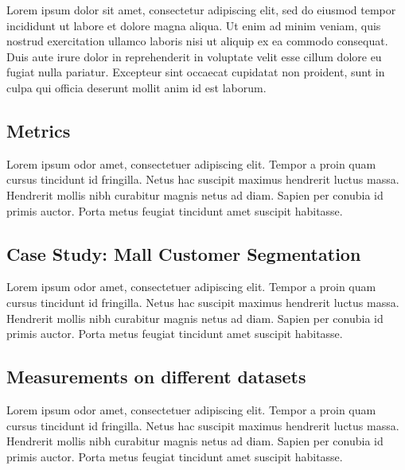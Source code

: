 \documentclass[10pt,twocolumn,letterpaper]{article}
\begin{document}
Lorem ipsum dolor sit amet, consectetur adipiscing elit, sed do eiusmod tempor
incididunt ut labore et dolore magna aliqua. Ut enim ad minim veniam, quis
nostrud exercitation ullamco laboris nisi ut aliquip ex ea commodo consequat.
Duis aute irure dolor in reprehenderit in voluptate velit esse cillum dolore eu
fugiat nulla pariatur. Excepteur sint occaecat cupidatat non proident, sunt in
culpa qui officia deserunt mollit anim id est laborum.


\subsection{Metrics}

Lorem ipsum odor amet, consectetuer adipiscing elit. Tempor a proin quam cursus
tincidunt id fringilla. Netus hac suscipit maximus hendrerit luctus massa.
Hendrerit mollis nibh curabitur magnis netus ad diam. Sapien per conubia id
primis auctor. Porta metus feugiat tincidunt amet suscipit habitasse.


\subsection{Case Study: Mall Customer Segmentation}

Lorem ipsum odor amet, consectetuer adipiscing elit. Tempor a proin quam cursus
tincidunt id fringilla. Netus hac suscipit maximus hendrerit luctus massa.
Hendrerit mollis nibh curabitur magnis netus ad diam. Sapien per conubia id
primis auctor. Porta metus feugiat tincidunt amet suscipit habitasse.


\subsection{Measurements on different datasets}

Lorem ipsum odor amet, consectetuer adipiscing elit. Tempor a proin quam cursus
tincidunt id fringilla. Netus hac suscipit maximus hendrerit luctus massa.
Hendrerit mollis nibh curabitur magnis netus ad diam. Sapien per conubia id
primis auctor. Porta metus feugiat tincidunt amet suscipit habitasse.

\end{document}
